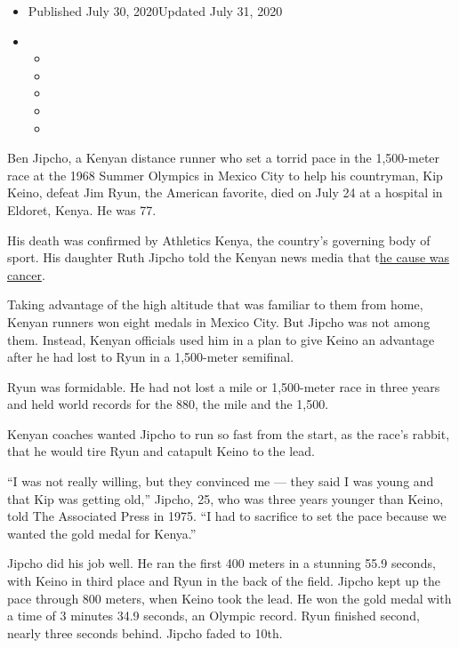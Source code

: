 \begin{itemize}
\item
  Published July 30, 2020Updated July 31, 2020
\item
  \begin{itemize}
  \item
  \item
  \item
  \item
  \item
  \end{itemize}
\end{itemize}

Ben Jipcho, a Kenyan distance runner who set a torrid pace in the
1,500-meter race at the 1968 Summer Olympics in Mexico City to help his
countryman, Kip Keino, defeat Jim Ryun, the American favorite, died on
July 24 at a hospital in Eldoret, Kenya. He was 77.

His death was confirmed by Athletics Kenya, the country's governing body
of sport. His daughter Ruth Jipcho told the Kenyan news media that
t\href{https://www.pd.co.ke/sports/athletics/tributes-pour-in-for-olympian-jipcho-45426/}{he
cause was cancer}.

Taking advantage of the high altitude that was familiar to them from
home, Kenyan runners won eight medals in Mexico City. But Jipcho was not
among them. Instead, Kenyan officials used him in a plan to give Keino
an advantage after he had lost to Ryun in a 1,500-meter semifinal.

Ryun was formidable. He had not lost a mile or 1,500-meter race in three
years and held world records for the 880, the mile and the 1,500.

Kenyan coaches wanted Jipcho to run so fast from the start, as the
race's rabbit, that he would tire Ryun and catapult Keino to the lead.

``I was not really willing, but they convinced me --- they said I was
young and that Kip was getting old,'' Jipcho, 25, who was three years
younger than Keino, told The Associated Press in 1975. ``I had to
sacrifice to set the pace because we wanted the gold medal for Kenya.''

Jipcho did his job well. He ran the first 400 meters in a stunning 55.9
seconds, with Keino in third place and Ryun in the back of the field.
Jipcho kept up the pace through 800 meters, when Keino took the lead. He
won the gold medal with a time of 3 minutes 34.9 seconds, an Olympic
record. Ryun finished second, nearly three seconds behind. Jipcho faded
to 10th.

